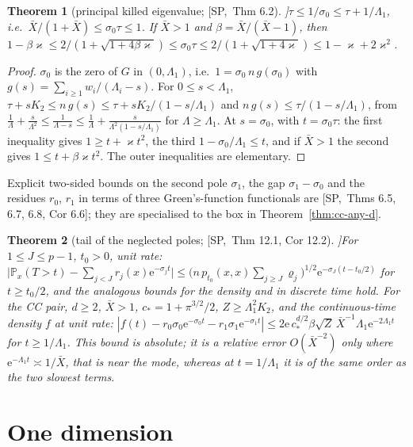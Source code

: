\documentclass[10pt,a4paper]{article}
\theoremstyle{plain}
\newtheorem{theorem}{Theorem}[section]
\theoremstyle{definition}
\newcommand{\src}[2]{[\textsf{#1},~#2]}           %
\newcommand{\SPE}{\textsf{SP}}
\renewcommand{\P}{\mathbb{P}}
\newcommand{\ee}{\mathrm{e}}
\newcommand{\Xb}{\bar X}
\begin{document}
\begin{theorem}[principal killed eigenvalue; \src{\SPE}{Thm 6.2}]\label{thm:sigma0}
$\tau\le1/\sigma_0\le\tau+1/\Lambda_1$, i.e.\ $\Xb/(1+\Xb)\le\sigma_0\tau\le1$. If $\Xb>1$ and $\beta=\Xb/(\Xb-1)$, then $1-\beta\varkappa\le2/(1+\sqrt{1+4\beta\varkappa})\le\sigma_0\tau\le2/(1+\sqrt{1+4\varkappa})\le1-\varkappa+2\varkappa^2$.
\end{theorem}
\begin{proof}
$\sigma_0$ is the zero of $G$ in $(0,\Lambda_1)$, i.e.\ $1=\sigma_0\,n\,g(\sigma_0)$ with $g(s)=\sum_{i\ge1}w_i/(\Lambda_i-s)$. For $0\le s<\Lambda_1$, $\tau+sK_2\le n\,g(s)\le\tau+sK_2/(1-s/\Lambda_1)$ and $n\,g(s)\le\tau/(1-s/\Lambda_1)$, from $\frac1{\Lambda}+\frac s{\Lambda^2}\le\frac1{\Lambda-s}\le\frac1\Lambda+\frac{s}{\Lambda^2(1-s/\Lambda_1)}$ for $\Lambda\ge\Lambda_1$. At $s=\sigma_0$, with $t=\sigma_0\tau$: the first inequality gives $1\ge t+\varkappa t^2$, the third $1-\sigma_0/\Lambda_1\le t$, and if $\Xb>1$ the second gives $1\le t+\beta\varkappa t^2$. The outer inequalities are elementary.
\end{proof}
Explicit two-sided bounds on the second pole $\sigma_1$, the gap $\sigma_1-\sigma_0$ and the residues $r_0$, $r_1$ in terms of three Green's-function functionals are \src{\SPE}{Thms 6.5, 6.7, 6.8, Cor 6.6}; they are specialised to the box in Theorem~\ref{thm:cc-any-d}.

\begin{theorem}[tail of the neglected poles; \src{\SPE}{Thm 12.1, Cor 12.2}]\label{thm:polestail}
For $1\le J\le p-1$, $t_0>0$, unit rate:
$\bigl|\P_x(T>t)-\sum_{j<J}r_j(x)\ee^{-\sigma_jt}\bigr|\le\bigl(n\,p_{t_0}(x,x)\sum_{j\ge J}\varrho_j\bigr)^{1/2}\ee^{-\sigma_J(t-t_0/2)}$ for $t\ge t_0/2$, and the analogous bounds for the density and in discrete time hold. For the CC pair, $d\ge2$, $\Xb>1$, $c_*=1+\pi^{3/2}/2$, $Z\ge\Lambda_1^2K_2$, and the continuous-time density $f$ at unit rate: $|f(t)-r_0\sigma_0\ee^{-\sigma_0t}-r_1\sigma_1\ee^{-\sigma_1t}|\le2\ee\,c_*^{d/2}\beta\sqrt Z\,\Xb^{-1}\Lambda_1\ee^{-2\Lambda_1t}$ for $t\ge1/\Lambda_1$. This bound is absolute; it is a relative error $O(\Xb^{-2})$ only where $\ee^{-\Lambda_1t}\asymp1/\Xb$, that is near the mode, whereas at $t=1/\Lambda_1$ it is of the same order as the two slowest terms.
\end{theorem}

\section{One dimension}\label{sec:1d}
\end{document}
